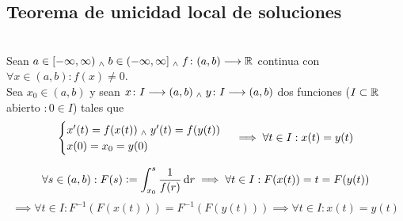 \subsection{Teorema de unicidad local de soluciones}
\begin{teo} \mbox{} \\
	Sean $a\in [-\infty, \infty) \; _{\wedge} \; b\in (-\infty, \infty] \; _{\wedge} \; f \colon (a,b) \longrightarrow \mathbb{R}$ continua con $\forall x \in (a,b) : f(x)\ne 0$. \\
	Sea $x_0 \in (a,b)$ y sean $x \colon I \longrightarrow (a,b) \; _{\wedge} \; y \colon I \longrightarrow (a,b)$ dos funciones ($I\subset \mathbb{R}$ abierto $ : 0 \in I$) tales que
	\[\begin{cases}
			x'(t)=f(x(t)) \; _{\wedge} \; y'(t)=f(y(t)) \\
			x(0)=x_0=y(0)
		\end{cases} \implies \forall t \in I : x(t)=y(t)\]
	\begin{dem}
		\[\forall s \in (a,b) : F(s)\defeq\int_{x_0}^{s} \frac{1}{f(r)}\odif{r} \implies \forall t \in I : F(x(t))=t=F(y(t))\]
		\[\implies \forall t \in I : F^{-1}(F(x(t)))=F^{-1}(F(y(t))) \implies \forall t \in I : x(t)=y(t)\]
	\end{dem}
\end{teo}


